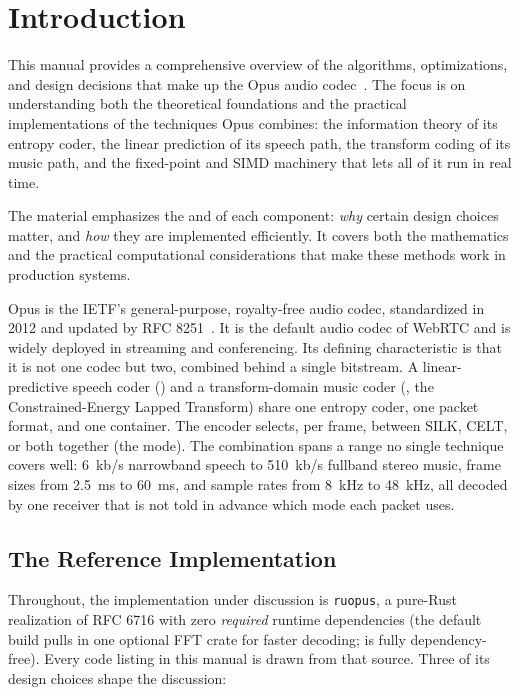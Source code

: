 
\section{Introduction}\label{sec:introduction}

This manual provides a comprehensive overview of the algorithms,
optimizations, and design decisions that make up the Opus audio
codec~\cite{rfc6716}. The focus is on understanding both the theoretical
foundations and the practical implementations of the techniques Opus combines:
the information theory of its entropy coder, the linear prediction of its speech
path, the transform coding of its music path, and the fixed-point and SIMD
machinery that lets all of it run in real time.

The material emphasizes the  and  of each component:
\emph{why} certain design choices matter, and \emph{how} they are implemented
efficiently. It covers both the mathematics and the practical computational
considerations that make these methods work in production systems.

Opus is the IETF's general-purpose, royalty-free audio codec, standardized in
2012 and updated by RFC 8251~\cite{rfc8251}. It is the default audio codec of
WebRTC and is widely deployed in streaming and conferencing. Its defining
characteristic is that it is not one codec but two, combined behind a single
bitstream. A linear-predictive speech coder () and a
transform-domain music coder (, the Constrained-Energy Lapped
Transform) share one entropy coder, one packet format, and one container. The
encoder selects, per frame, between SILK, CELT, or both together (the
 mode). The combination spans a range no single technique covers
well: 6~kb/s narrowband speech to 510~kb/s fullband stereo music, frame sizes
from 2.5~ms to 60~ms, and sample rates from 8~kHz to 48~kHz, all decoded by one
receiver that is not told in advance which mode each packet uses.

\subsection{The Reference Implementation}\label{subsec:reference_impl}

Throughout, the implementation under discussion is
\texttt{ruopus}, a pure-Rust realization of RFC 6716 with zero \emph{required}
runtime dependencies (the default build pulls in one optional FFT crate for
faster decoding;  is fully dependency-free).
Every code listing in this manual is drawn from that source. Three of its design
choices shape the discussion:

